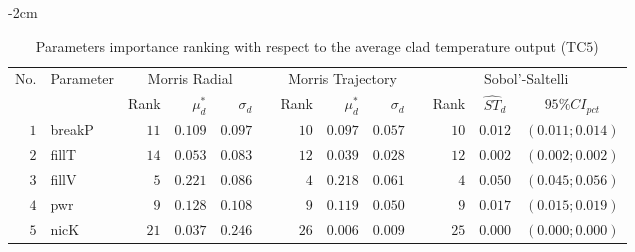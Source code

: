 \begin{table*}[!htbp]\centering
{}
\begin{adjustwidth*}{}{-2cm}
\caption{Parameters importance ranking with respect to the average clad temperature output (TC$5$)}
\label{tab:app_screening_tc5_average}
\begin{tabular}{@{}rlrrrrrrrrrcc@{}}\toprule
\multirow{2}{*}{\footnotesize{No.}} & \multirow{2}{*}{\footnotesize{Parameter}} & \multicolumn{3}{c}{\footnotesize{Morris Radial}} & \phantom{a} & \multicolumn{3}{c}{\footnotesize{Morris Trajectory}}  &\phantom{a}& \multicolumn{3}{c}{\footnotesize{Sobol'-Saltelli}}                               \\             
                                                                                  \cmidrule{3-5}                                                   \cmidrule{7-9}                                                      \cmidrule{11-13}
                                    &                                           & \footnotesize{Rank}   & $\mu^*_d$ & $\sigma_d$   &             & \footnotesize{Rank} & $\mu^*_d$ & $\sigma_d$          &           & \footnotesize{Rank} & \footnotesize{$\hat{ST}_d$} & \footnotesize{$95\%CI_{pct}$}\\ \midrule
\footnotesize{$1 $} & \footnotesize{breakP   } & \footnotesize{$11$} & \footnotesize{$0.109$} & \footnotesize{$0.097$} && \footnotesize{$10$} & \footnotesize{$0.097$} & \footnotesize{$0.057$} && \footnotesize{$10$} & \footnotesize{$0.012$} & \footnotesize{$(0.011;0.014)$} \\
\footnotesize{$2 $} & \footnotesize{fillT    } & \footnotesize{$14$} & \footnotesize{$0.053$} & \footnotesize{$0.083$} && \footnotesize{$12$} & \footnotesize{$0.039$} & \footnotesize{$0.028$} && \footnotesize{$12$} & \footnotesize{$0.002$} & \footnotesize{$(0.002;0.002)$} \\
\footnotesize{$3 $} & \footnotesize{fillV    } & \footnotesize{$5 $} & \footnotesize{$0.221$} & \footnotesize{$0.086$} && \footnotesize{$4 $} & \footnotesize{$0.218$} & \footnotesize{$0.061$} && \footnotesize{$4 $} & \footnotesize{$0.050$} & \footnotesize{$(0.045;0.056)$} \\
\footnotesize{$4 $} & \footnotesize{pwr      } & \footnotesize{$9 $} & \footnotesize{$0.128$} & \footnotesize{$0.108$} && \footnotesize{$9 $} & \footnotesize{$0.119$} & \footnotesize{$0.050$} && \footnotesize{$9 $} & \footnotesize{$0.017$} & \footnotesize{$(0.015;0.019)$} \\
\footnotesize{$5 $} & \footnotesize{nicK     } & \footnotesize{$21$} & \footnotesize{$0.037$} & \footnotesize{$0.246$} && \footnotesize{$26$} & \footnotesize{$0.006$} & \footnotesize{$0.009$} && \footnotesize{$25$} & \footnotesize{$0.000$} & \footnotesize{$(0.000;0.000)$} \\

\end{tabular}
\end{adjustwidth*}
\end{table*}
